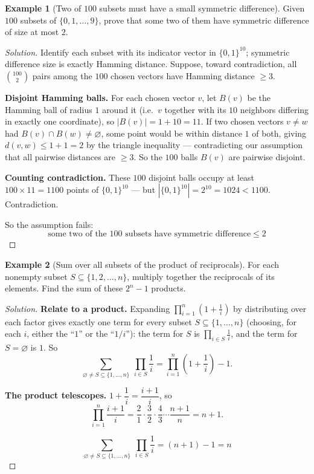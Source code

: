 \documentclass[11pt]{article}
\theoremstyle{definition}
\newtheorem{example}{Example}[section]
\begin{document}
\begin{example}[Two of $100$ subsets must have a small symmetric difference]
Given $100$ subsets of $\{0,1,\dots,9\}$, prove that some two of them have symmetric difference of size at most $2$.
\end{example}
\begin{proof}[Solution]
Identify each subset with its indicator vector in $\{0,1\}^{10}$; symmetric difference size is exactly Hamming distance. Suppose, toward contradiction, all $\binom{100}2$ pairs among the $100$ chosen vectors have Hamming distance $\ge3$.

\textbf{Disjoint Hamming balls.} For each chosen vector $v$, let $B(v)$ be the Hamming ball of radius $1$ around it (i.e.\ $v$ together with its $10$ neighbors differing in exactly one coordinate), so $|B(v)|=1+10=11$. If two chosen vectors $v\ne w$ had $B(v)\cap B(w)\ne\varnothing$, some point would be within distance $1$ of both, giving $d(v,w)\le1+1=2$ by the triangle inequality — contradicting our assumption that all pairwise distances are $\ge3$. So the $100$ balls $B(v)$ are pairwise disjoint.

\textbf{Counting contradiction.} These $100$ disjoint balls occupy at least $100\times11=1100$ points of $\{0,1\}^{10}$ — but $|\{0,1\}^{10}|=2^{10}=1024<1100$. Contradiction.

So the assumption fails:
\[
\boxed{\text{some two of the }100\text{ subsets have symmetric difference}\le2}
\]
\end{proof}

\begin{example}[Sum over all subsets of the product of reciprocals]
For each nonempty subset $S\subseteq\{1,2,\dots,n\}$, multiply together the reciprocals of its elements. Find the sum of these $2^n-1$ products.
\end{example}
\begin{proof}[Solution]
\textbf{Relate to a product.} Expanding $\displaystyle\prod_{i=1}^n\left(1+\frac1i\right)$ by distributing over each factor gives exactly one term for every subset $S\subseteq\{1,\dots,n\}$ (choosing, for each $i$, either the ``$1$'' or the ``$1/i$''): the term for $S$ is $\prod_{i\in S}\frac1i$, and the term for $S=\varnothing$ is $1$. So
\[
\sum_{\varnothing\ne S\subseteq\{1,\dots,n\}}\ \prod_{i\in S}\frac1i=\prod_{i=1}^n\left(1+\frac1i\right)-1.
\]

\textbf{The product telescopes.} $1+\dfrac1i=\dfrac{i+1}i$, so
\[
\prod_{i=1}^n\frac{i+1}i=\frac21\cdot\frac32\cdot\frac43\cdots\frac{n+1}n=n+1.
\]

\[
\boxed{\sum_{\varnothing\ne S\subseteq\{1,\dots,n\}}\ \prod_{i\in S}\frac1i=(n+1)-1=n}
\]
\end{proof}
\end{document}
